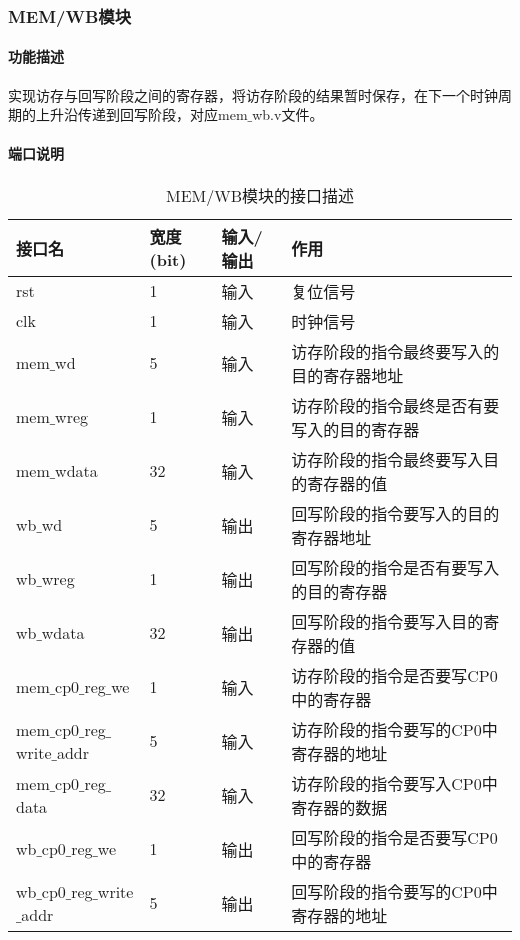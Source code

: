 \subsubsection{MEM/WB模块}
\paragraph{功能描述}
\quad

\quad

实现访存与回写阶段之间的寄存器，将访存阶段的结果暂时保存，在下一个时钟周期的上升沿传递到回写阶段，对应mem$\_$wb.v文件。
\paragraph{端口说明}
\quad

\quad
\begin{table}[H]
	\centering
	\caption{MEM/WB模块的接口描述}
	\begin{tabular}{|l|l|l|l|}
		\hline
		接口名 & 宽度(bit) & 输入/输出 & 作用 \\
		\hline
		rst & 1 & 输入 & 复位信号 \\
		\hline
		clk & 1 & 输入 & 时钟信号 \\
		\hline
		mem$\_$wd & 5 & 输入 & 访存阶段的指令最终要写入的目的寄存器地址 \\
		\hline
		mem$\_$wreg & 1 & 输入 & 访存阶段的指令最终是否有要写入的目的寄存器 \\
		\hline
		mem$\_$wdata & 32 & 输入 & 访存阶段的指令最终要写入目的寄存器的值 \\
		\hline
		wb$\_$wd & 5 & 输出 & 回写阶段的指令要写入的目的寄存器地址 \\
		\hline
		wb$\_$wreg & 1 & 输出 & 回写阶段的指令是否有要写入的目的寄存器 \\
		\hline
		wb$\_$wdata & 32 & 输出 & 回写阶段的指令要写入目的寄存器的值 \\
		\hline
		mem$\_$cp0$\_$reg$\_$we & 1 & 输入 & 访存阶段的指令是否要写CP0中的寄存器 \\
		\hline
		mem$\_$cp0$\_$reg$\_$write$\_$addr & 5 & 输入 & 访存阶段的指令要写的CP0中寄存器的地址 \\
		\hline
		mem$\_$cp0$\_$reg$\_$data & 32 & 输入 & 访存阶段的指令要写入CP0中寄存器的数据 \\
		\hline
		wb$\_$cp0$\_$reg$\_$we & 1 & 输出 & 回写阶段的指令是否要写CP0中的寄存器 \\
		\hline
		wb$\_$cp0$\_$reg$\_$write$\_$addr & 5 & 输出 & 回写阶段的指令要写的CP0中寄存器的地址 \\

\end{tabular}
\end{table}
